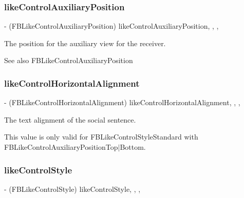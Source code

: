 \subsubsection{\texorpdfstring{like\+Control\+Auxiliary\+Position}{likeControlAuxiliaryPosition}}
{\footnotesize\ttfamily -\/ (F\+B\+Like\+Control\+Auxiliary\+Position) like\+Control\+Auxiliary\+Position\hspace{0.3cm}{\ttfamily [read]}, {\ttfamily [write]}, {\ttfamily [nonatomic]}, {\ttfamily [assign]}}

The position for the auxiliary view for the receiver.

\begin{DoxySeeAlso}{See also}
F\+B\+Like\+Control\+Auxiliary\+Position 
\end{DoxySeeAlso}
\mbox{\label{interfaceFBLikeControl_a5ff124a8db638f033ac760e694fcd2b7}} 
\subsubsection{\texorpdfstring{like\+Control\+Horizontal\+Alignment}{likeControlHorizontalAlignment}}
{\footnotesize\ttfamily -\/ (F\+B\+Like\+Control\+Horizontal\+Alignment) like\+Control\+Horizontal\+Alignment\hspace{0.3cm}{\ttfamily [read]}, {\ttfamily [write]}, {\ttfamily [nonatomic]}, {\ttfamily [assign]}}

The text alignment of the social sentence.

This value is only valid for F\+B\+Like\+Control\+Style\+Standard with F\+B\+Like\+Control\+Auxiliary\+Position\+Top$\vert$\+Bottom. \mbox{\label{interfaceFBLikeControl_aa0122a09a145e1246d49a5ec0da4e42e}} 
\subsubsection{\texorpdfstring{like\+Control\+Style}{likeControlStyle}}
{\footnotesize\ttfamily -\/ (F\+B\+Like\+Control\+Style) like\+Control\+Style\hspace{0.3cm}{\ttfamily [read]}, {\ttfamily [write]}, {\ttfamily [nonatomic]}, {\ttfamily [assign]}}

